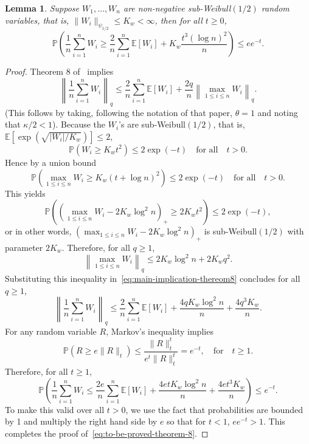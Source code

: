\documentclass[11pt]{article}
\newtheorem{lemma}[theorem]{Lemma}
\begin{document}
\begin{appendices}
\begin{lemma}\label{lem:application-theorem8}
Suppose $W_1, \ldots, W_n$ are non-negative sub-Weibull$(1/2)$ random variables, that is, $\|W_i\|_{\psi_{1/2}} \le K_w < \infty$, then for all $t \ge 0$,
\begin{equation}\label{eq:to-be-proved-theorem-8}
\mathbb{P}\left(\frac{1}{n}\sum_{i=1}^n W_i \ge \frac{2}{n}\sum_{i=1}^n \mathbb{E}[W_i] + K_w\frac{t^3(\log n)^2}{n}\right) \le ee^{-t}.
\end{equation}
\end{lemma}
\begin{proof}
Theorem 8 of~\cite{Bouch05} implies
\begin{equation}\label{eq:main-implication-thereom8}
\left\|\frac{1}{n}\sum_{i=1}^n W_i\right\|_q \le \frac{2}{n}\sum_{i=1}^n \mathbb{E}[W_i] + \frac{2q}{n}\left\|\max_{1\le i\le n} W_i\right\|_q.
\end{equation}
(This follows by taking, following the notation of that paper, $\theta = 1$ and noting that $\kappa/2 < 1$). Because the $W_i$'s are sub-Weibull$(1/2)$, that is, $\mathbb{E}\left[\exp(\sqrt{|W_i|/K_w})\right] \le 2$,
\[
\mathbb{P}\left(W_i \ge K_wt^2\right) \le 2\exp\left(-t\right)\quad\mbox{for all}\quad t > 0.
\]
Hence by a union bound
\[
\mathbb{P}\left(\max_{1\le i\le n}W_i \ge K_w(t + \log n)^2\right) \le 2\exp(-t)\quad\mbox{for all}\quad t > 0.
\]
This yields
\[
\mathbb{P}\left((\max_{1\le i\le n} W_i - 2K_w\log^2n)_+ \ge 2K_wt^2\right) \le 2\exp(-t),
\]
or in other words, $(\max_{1\le i\le n}W_i - 2K_w\log^2n)_+$ is sub-Weibull$(1/2)$ with parameter $2K_w$. Therefore, for all $q \ge 1$,
\[
\left\|\max_{1\le i\le n}W_i\right\|_{q} \le 2K_w\log^2n + 2K_wq^2.
\]
Substituting this inequality in~\eqref{eq:main-implication-thereom8} concludes for all $q \ge 1$,
\[
\left\|\frac{1}{n}\sum_{i=1}^n W_i\right\|_q \le \frac{2}{n}\sum_{i=1}^n \mathbb{E}[W_i] + \frac{4qK_w\log^2n}{n} + \frac{4q^3K_w}{n}.
\]
For any random variable $R$, Markov's inequality implies
\[
\mathbb{P}\left(R \ge e\|R\|_t\right) \le \frac{\|R\|_t^t}{e^t\|R\|_t^t} = e^{-t},\quad\mbox{for}\quad t \ge 1. 
\]
Therefore, for all $t\ge 1$,
\[
\mathbb{P}\left(\frac{1}{n}\sum_{i=1}^n W_i \le \frac{2e}{n}\sum_{i=1}^n \mathbb{E}[W_i] + \frac{4etK_w\log^2n}{n} + \frac{4et^3K_w}{n}\right) \le e^{-t}.
\]
To make this valid over all $t > 0$, we use the fact that probabilities are bounded by 1 and multiply the right hand side by $e$ so that for $t < 1$, $ee^{-t} > 1$. This completes the proof of~\eqref{eq:to-be-proved-theorem-8}.
\end{proof}


\end{appendices}
\end{document}
